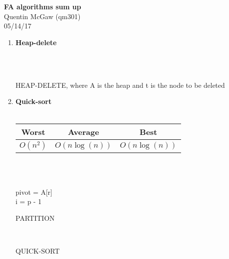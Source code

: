 \documentclass[11pt]{article}
\begin{document}
\begin{center} {\Large\bf FA algorithms sum up}  \\ Quentin McGaw (qm301) \\ 05/14/17
\end{center}

\begin{enumerate}
    \item \textbf{Heap-delete} \\\\    
    \begin{algorithm}[H]
        \Indm{}\\
        \Indp
        \caption{HEAP-DELETE, where A is the heap and t is the node to be deleted}
    \end{algorithm}
    
    \item \textbf{Quick-sort} \\\\
    \begin{tabular}{c|c|c}
        Worst & Average & Best \\
        \hline
        $O(n^2)$ & $O(n\log(n))$ & $O(n\log(n))$
    \end{tabular}
    \\
    \begin{algorithm}[H]
        \Indm{} \\
        \Indp
            pivot = A[r] \\
            i = p - 1 \\
        \caption{PARTITION}
    \end{algorithm}
    \begin{algorithm}[H]
        \Indm{} \\
        \Indp
        \caption{QUICK-SORT}
    \end{algorithm}


\end{enumerate}
\end{document}
